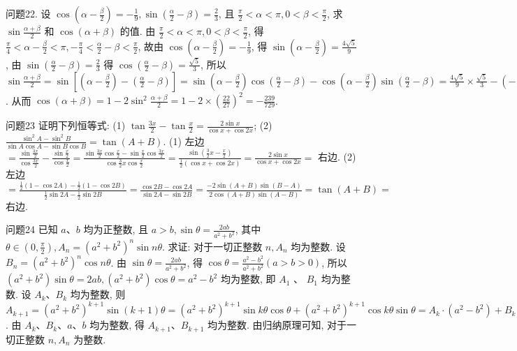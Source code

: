问题22. 设 $\cos \left(\alpha-\frac{\beta}{2}\right)=-\frac{1}{9}, \sin \left(\frac{\alpha}{2}-\beta\right)=\frac{2}{3}$, 且 $\frac{\pi}{2}<\alpha<\pi, 0<\beta<\frac{\pi}{2}$, 求 $\sin \frac{\alpha+\beta}{2}$ 和 $\cos (\alpha+\beta)$ 的值.
由 $\frac{\pi}{2}<\alpha<\pi, 0<\beta<\frac{\pi}{2}$, 得 $\frac{\pi}{4}<\alpha-\frac{\beta}{2}<\pi,-\frac{\pi}{4}<\frac{\alpha}{2}-\beta<\frac{\pi}{2}$,
故由 $\cos \left(\alpha-\frac{\beta}{2}\right)=-\frac{1}{9}$, 得 $\sin \left(\alpha-\frac{\beta}{2}\right)=\frac{4 \sqrt{5}}{9}$, 由 $\sin \left(\frac{\alpha}{2}-\beta\right)=\frac{2}{3}$ 得 $\cos \left(\frac{\alpha}{2}-\beta\right)=\frac{\sqrt{5}}{3}$, 所以 $\sin \frac{\alpha+\beta}{2}=\sin \left[\left(\alpha-\frac{\beta}{2}\right)-\left(\frac{\alpha}{2}-\beta\right)\right]= \sin \left(\alpha-\frac{\beta}{2}\right) \cos \left(\frac{\alpha}{2}-\beta\right)-\cos \left(\alpha-\frac{\beta}{2}\right) \sin \left(\frac{\alpha}{2}-\beta\right)=\frac{4 \sqrt{5}}{9} \times \frac{\sqrt{5}}{3}-\left(-\frac{1}{9}\right) \times \frac{2}{3}=\frac{22}{27}$. 从而 $\cos (\alpha+\beta)=1-2 \sin ^2 \frac{\alpha+\beta}{2}=1-2 \times\left(\frac{22}{27}\right)^2=-\frac{239}{729}$.



问题23 证明下列恒等式:
(1) $\tan \frac{3 x}{2}-\tan \frac{x}{2}=\frac{2 \sin x}{\cos x+\cos 2 x}$;
(2) $\frac{\sin ^2 A-\sin ^2 B}{\sin A \cos A-\sin B \cos B}=\tan (A+B)$.
(1) 左边 $=\frac{\sin \frac{3 x}{2}}{\cos \frac{3 x}{2}}-\frac{\sin \frac{x}{2}}{\cos \frac{x}{2}}=\frac{\sin \frac{3 x}{2} \cos \frac{x}{2}-\sin \frac{x}{2} \cos \frac{3 x}{2}}{\cos \frac{3}{2} x \cos \frac{x}{2}}=\frac{\sin \left(\frac{3}{2} x-\frac{x}{2}\right)}{\frac{1}{2}(\cos x+\cos 2 x)}=\frac{2 \sin x}{\cos x+\cos 2 x}=$ 右边.
(2) 左边 $=\frac{\frac{1}{2}(1-\cos 2 A)-\frac{1}{2}(1-\cos 2 B)}{\frac{1}{2} \sin 2 A-\frac{1}{2} \sin 2 B}=\frac{\cos 2 B-\cos 2 A}{\sin 2 A-\sin 2 B} =\frac{-2 \sin (A+B) \sin (B-A)}{2 \cos (A+B) \sin (A-B)}=\tan (A+B)=$ 右边.



问题24 已知 $a 、 b$ 均为正整数, 且 $a>b, \sin \theta=\frac{2 a b}{a^2+b^2}$, 其中 $\theta \in\left(0, \frac{\pi}{2}\right), A_n= \left(a^2+b^2\right)^n \sin n \theta$. 求证: 对于一切正整数 $n, A_n$ 均为整数.
设 $B_n=\left(a^2+b^2\right)^n \cos n \theta$. 由 $\sin \theta=\frac{2 a b}{a^2+b^2}$, 得 $\cos \theta=\frac{a^2-b^2}{a^2+b^2}(a> b>0)$, 所以 $\left(a^2+b^2\right) \sin \theta=2 a b,\left(a^2+b^2\right) \cos \theta=a^2-b^2$ 均为整数, 即 $A_1$ 、 $B_1$ 均为整数.
设 $A_k 、 B_k$ 均为整数, 则 $A_{k+1}=\left(a^2+b^2\right)^{k+1} \sin (k+1) \theta=\left(a^2+\right. \left.b^2\right)^{k+1} \sin k \theta \cos \theta+\left(a^2+b^2\right)^{k+1} \cos k \theta \sin \theta=A_k \cdot\left(a^2-b^2\right)+B_k \cdot 2 a b, B_{k+1}= \left(a^2+b^2\right)^{k+1} \cos (k+1) \theta=\left(a^2+b^2\right)^{k+1} \cos k \theta \cos \theta-\left(a^2+b^2\right)^{k+1} \sin k \theta \cos \theta= B_k \cdot\left(a^2-b^2\right)-A_k \cdot 2 a b$. 由 $A_k 、 B_k 、 a 、 b$ 均为整数, 得 $A_{k+1} 、 B_{k+1}$ 均为整数.
由归纳原理可知, 对于一切正整数 $n, A_n$ 为整数.



